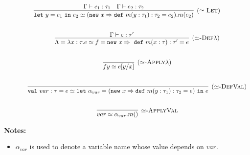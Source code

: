 \documentclass{llncs}
\newcommand{\keywadj}[1]{\mathtt{#1}}
\newcommand{\keyw}[1]{\keywadj{#1}~}
\begin{document}
\[
\begin{array}{c}
	
\infer[\textsc{($\simeq$-Let)}]
	{\keyw{let} y = e_1~\keyw{in} e_2 \simeq (\keyw{new} x \Rightarrow \keyw{def} m(y: \tau_1) : \tau_2 = e_2).m(e_2)}
	{\Gamma \vdash e_1 : \tau_1 & \Gamma \vdash e_2 : \tau_2}  \\[5ex]
~~~~~~~~~~
\infer[\textsc{($\simeq$-Def$\lambda$)}]
	{\Lambda = \lambda x : \tau . e \simeq f = \keyw{new} x \Rightarrow~\keyw{def} m(x : \tau) : \tau' = e}
	{\Gamma \vdash e : \tau'}\\[5ex]
~~~~~~~~~~
\infer[\textsc{($\simeq$-Apply$\lambda$)}] 
	{f y \simeq e[y/x] }
	{} \\[5ex]
~~~~~~~~~~

\infer[\textsc{($\simeq$-DefVal)}]
	{\keyw{val} var : \tau = e \simeq \keyw{let} \alpha_{var} = (\keyw{new} x \Rightarrow \keyw{def} m(y : \tau_1) : \tau_2 = e)~\keyw{in} e}
	{} \\[5ex]
~~~~~~~~~~
\infer[\textsc{$\simeq$-ApplyVal}]
	{var \simeq \alpha_{var}.m()}
	{}
  
\end{array}
\]	

\noindent \textbf{Notes:}
\begin{itemize}
	\item $\alpha_{var}$ is used to denote a variable name whose value depends on $var$.
\end{itemize}
\end{document}
